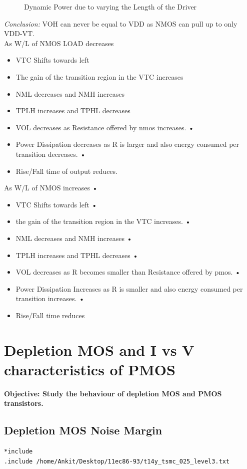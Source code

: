 \documentclass[12pt,a4paper]{article}
\begin{document}
\begin{center}
\begin{figure}[!ht]
\caption[Short]{Dynamic Power due to varying the Length of the Driver}
\end{figure}
\clearpage
\textit{Conclusion:}
VOH can never be equal to VDD as NMOS can pull up to only VDD-VT.
\\ As W/L of NMOS LOAD decreases 
\begin{itemize}
\item VTC Shifts towards left 
\item The gain of the transition region in the VTC increases 
\item NML decreases and NMH increases 
\item TPLH increases and TPHL decreases 
\item VOL decreases as Resistance offered by nmos increases. • 
\item Power Dissipation decreases as R is larger and also energy consumed per transition decreases. • 
\item Rise/Fall time of output reduces.
\end{itemize}
As W/L of NMOS increases • 
\begin{itemize}
\item VTC Shifts towards left • 
\item the gain of the transition region in the VTC increases. • 
\item NML decreases and NMH increases • 
\item TPLH increases and TPHL decreases • 
\item VOL decreases as R becomes smaller than Resistance offered by pmos. • 
\item Power Dissipation Increases as R is smaller and also energy consumed per transition increases. • 
\item Rise/Fall time reduces
\end{itemize}
\clearpage

\section{Depletion MOS and I vs V characteristics of PMOS}
\bf{Objective:}\vspace{3pt}
Study the behaviour of depletion MOS and PMOS transistors.\\
\vspace{5pt}
\subsection{Depletion MOS Noise Margin}
\begin{lstlisting}
*include
.include /home/Ankit/Desktop/11ec86-93/t14y_tsmc_025_level3.txt


\end{lstlisting}
\end{center}
\end{document}
